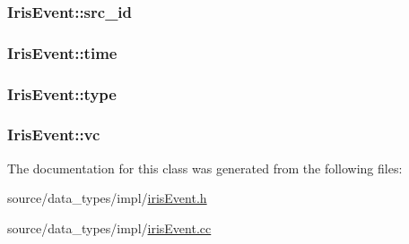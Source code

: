 \hypertarget{classIrisEvent_0ea5ae351f3d7dba0a5ad697a7928754}{
\subsubsection[{src\_\-id}]{ {\bf IrisEvent::src\_\-id}}}
\label{classIrisEvent_0ea5ae351f3d7dba0a5ad697a7928754}


\hypertarget{classIrisEvent_cd8c9add4afdbc69bf7dbcaf8a61ba01}{
\subsubsection[{time}]{ {\bf IrisEvent::time}}}
\label{classIrisEvent_cd8c9add4afdbc69bf7dbcaf8a61ba01}


\hypertarget{classIrisEvent_339423ccde297a9d2f4ad3e06fc28030}{
\subsubsection[{type}]{ {\bf IrisEvent::type}}}
\label{classIrisEvent_339423ccde297a9d2f4ad3e06fc28030}


\hypertarget{classIrisEvent_86ee921447bbc46175221fd912f6e0a7}{
\subsubsection[{vc}]{ {\bf IrisEvent::vc}}}
\label{classIrisEvent_86ee921447bbc46175221fd912f6e0a7}




The documentation for this class was generated from the following files:\begin{CompactItemize}
\item 
source/data\_\-types/impl/\hyperlink{irisEvent_8h}{irisEvent.h}\item 
source/data\_\-types/impl/\hyperlink{irisEvent_8cc}{irisEvent.cc}\end{CompactItemize}
